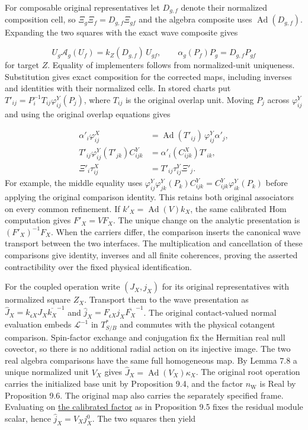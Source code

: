 \documentclass[
  english,
  11pt,
  reqno]{amsart}
\begin{document}
For composable original representatives let \(D_{g,f}\) denote their
normalized composition cell, so \(\Xi_g\Xi_f=D_{g,f}\Xi_{gf}\) and the
algebra composite uses \(\operatorname{Ad}(D_{g,f})\). Expanding the two
squares with the exact wave composite gives

\label{eq:analytic-physical-cells} \[
U_g\mathcal A_g(U_f)=k_Z(D_{g,f})\,U_{gf},\qquad
\alpha_g(P_f)P_g=D_{g,f}P_{gf}
\] for target \(Z\). Equality of implementers follows from
normalized-unit uniqueness. Substitution gives exact composition for the
corrected maps, including inverses and identities with their normalized
cells. In stored charts put
\(T'_{ij}=P_i^{-1}T_{ij}\varphi^Y_{ij}(P_j)\), where \(T_{ij}\) is the
original overlap unit. Moving \(P_j\) across \(\varphi_{ij}^Y\) and
using the original overlap equations gives

\label{eq:analytic-wave-both-associators} \[
\begin{aligned}
\alpha'_i\varphi^X_{ij}
 &=\operatorname{Ad}(T'_{ij})\,\varphi^Y_{ij}\alpha'_j,\\
T'_{ij}\varphi^Y_{ij}(T'_{jk})C^Y_{ijk}
 &=\alpha'_i(C^X_{ijk})T'_{ik},\\
\Xi'_i\tau^X_{ij}&=T'_{ij}\tau^Y_{ij}\Xi'_j .
\end{aligned}
\] For example, the middle equality uses
\(\varphi^Y_{ij}\varphi^Y_{jk}(P_k)C^Y_{ijk}=C^Y_{ijk}\varphi^Y_{ik}(P_k)\)
before applying the original comparison identity. This retains both
original associators on every common refinement. If
\(k'_X=\operatorname{Ad}(V)k_X\), the same calibrated Hom computation
gives \(F'_X=VF_X\). The unique change on the analytic presentation is
\((F'_X)^{-1}F_X\). When the carriers differ, the comparison inserts the
canonical wave transport between the two interfaces. The multiplication
and cancellation of these comparisons give identity, inverses and all
finite coherences, proving the asserted contractibility over the fixed
physical identification.

For the coupled operation write \((J_X,j_X)\) for its original
representatives with normalized square \(Z_X\). Transport them to the
wave presentation as
\(\widehat J_X=k_{\mathfrak cX}J_X\overline{k_X}^{-1}\) and
\(\widehat j_X=F_{\mathfrak cX}j_X\overline{F_X}^{-1}\). The original
contact-valued normal evaluation embeds \(\mathcal L^{-1}\) in
\(T^*_{S/B}\) and commutes with the physical cotangent comparison.
Spin-factor exchange and conjugation fix the Hermitian real null
covector, so there is no additional radial action on its injective
image. The two real algebra comparisons have the same full homogeneous
map. By Lemma 7.8 a unique normalized unit \(V_X\) gives
\(\widehat J_X=\operatorname{Ad}(V_X)\kappa_X\). The original root
operation carries the initialized base unit by Proposition 9.4, and the
factor \(n_{\mathrm W}\) is Real by Proposition 9.6. The original map
also carries the separately specified frame. Evaluating on
\hyperref[eq:analytic-factor-calibration]{the calibrated factor} as in
Proposition 9.5 fixes the residual module scalar, hence
\(\widehat j_X=V_X j_X^0\). The two squares then yield
\end{document}
